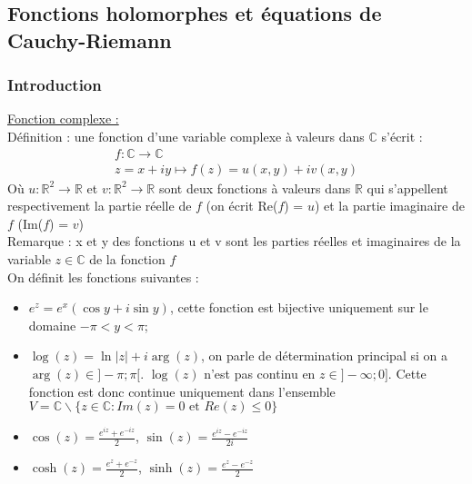 \documentclass[../main.tex]{subfiles}
\begin{document}
\localtableofcontents
\subsection{Fonctions holomorphes et équations de Cauchy-Riemann}
\subsubsection{Introduction}
\quad \underline{Fonction complexe :}\\
Définition : une fonction d'une variable complexe à valeurs dans $\mathbb{C}$ s'écrit :\\
\begin{equation}
    \begin{split}
        f: \mathbb{C} \rightarrow \mathbb{C}\\
        z = x+iy \mapsto f(z) = u(x,y) + i v(x,y)
    \end{split}
\end{equation}
Où $u:\mathbb{R}^2 \rightarrow \mathbb{R}$ et $v:\mathbb{R}^2\rightarrow \mathbb{R}$ sont deux fonctions à valeurs dans $\mathbb{R}$ qui s'appellent respectivement la partie réelle de $f$ (on écrit Re($f$) = $u$) et la partie imaginaire de $f$ (Im($f$) = $v$)\\

\color{gray} Remarque : x et y des fonctions u et v sont les parties réelles et imaginaires de la variable $z\in \mathbb{C}$ de la fonction $f$\color{black}\\

On définit les fonctions suivantes :\\
\begin{itemize}
    \item $e^z = e^x(\cos{y}+i\sin{y})$, cette fonction est bijective uniquement sur le domaine $-\pi<y<\pi$;\\
    \item $\log(z)=\ln{\lvert z \rvert} + i \arg(z)$, on parle de détermination principal si on a $\arg(z) \in ]-\pi;\pi[$. \warning $\log(z)$ n'est pas continu en $z\in ]-\infty; 0]$. Cette fonction est donc continue uniquement dans l'ensemble $V=\mathbb{C}\backslash \{z\in \mathbb{C} : Im(z)=0 \text{ et } Re(z) \leq 0\}$\\
    \item $\cos(z) = \frac{e^{iz}+e^{-iz}}{2}$, $\sin(z) = \frac{e^{iz}-e^{-iz}}{2i}$\\
    \item $\cosh(z) = \frac{e^{z}+e^{-z}}{2}$, $\sinh(z) = \frac{e^{z}-e^{-z}}{2}$\\
\end{itemize}
\end{document}
